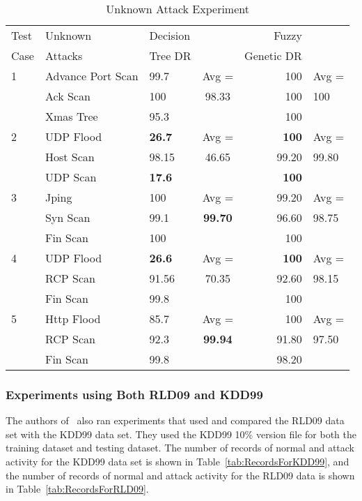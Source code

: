 \documentclass{sig-alternate}
\begin{document}
\begin{table}
\caption{Unknown Attack Experiment}
\begin{tabular}{|lllcrl|} \hline
Test & Unknown & Decision & & Fuzzy & \\
Case & Attacks & Tree DR & & Genetic DR & \\ \hline

1 & Advance Port Scan & 99.7 & Avg = & 100 & Avg =\\
  & Ack Scan          & 100  & 98.33 & 100 & 100\\
  & Xmas Tree         & 95.3 &       & 100 &\\ \hline

2 & UDP Flood & \textbf{26.7} & Avg = & \textbf{100} & Avg =\\
  & Host Scan & 98.15         & 46.65 & 99.20        & 99.80\\
  & UDP Scan  & \textbf{17.6} &       & \textbf{100} &\\ \hline

3 & Jping    & 100 & Avg =          & 99.20 & Avg =\\
  & Syn Scan & 99.1& \textbf{99.70} & 96.60 & 98.75\\
  & Fin Scan & 100 &                & 100 &\\ \hline

4 & UDP Flood & \textbf{26.6} & Avg = & \textbf{100} & Avg =\\
  & RCP Scan  & 91.56         & 70.35 & 92.60        & 98.15\\
  & Fin Scan  & 99.8          &       & 100          &\\ \hline

5 & Http Flood & 85.7& Avg =          & 100 & Avg =\\
  & RCP Scan  & 92.3 & \textbf{99.94} & 91.80 & 97.50\\
  & Fin Scan  & 99.8 &                & 98.20 &\\
\hline\end{tabular}
\label{tab:fuzGenExp2}
\end{table}




\subsubsection{Experiments using Both RLD09 and KDD99}
The authors of~\cite{6496342, 6559603} also ran experiments that used and compared the RLD09 data set with the KDD99 data set. They used the KDD99 10\% version file for both the training dataset and testing dataset. The number of records of normal and attack activity for the KDD99 data set is shown in Table~\ref{tab:RecordsForKDD99}, and the number of records of normal and attack activity for the RLD09 data is shown in Table~\ref{tab:RecordsForRLD09}.
\end{document}
